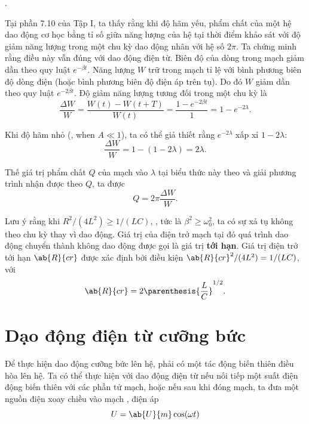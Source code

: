 .

Tại phần 7.10 của Tập I, ta thấy rằng khi độ hãm yếu, phẩm chất của một hệ dao động cơ học bằng tỉ số giữa năng lượng của hệ tại thời điểm khảo sát với độ giảm năng lượng trong một chu kỳ dao động nhân với hệ số $2\pi$.
Ta chứng minh rằng điều này vẫn đúng với dao động điện từ.
Biên độ của dòng trong mạch giảm dần theo quy luật $e^{-\beta t}$.
Năng lượng $W$ trữ trong mạch tỉ lệ với bình phương biên độ dòng điện (hoặc bình phương biên độ điện áp trên tụ).
Do đó $W$ giảm dần theo quy luật $e^{-2\beta t}$.
Độ giảm năng lượng tương đối trong một chu kỳ là
\begin{equation*}
    \frac{\Delta{W}}{W} = \frac{W(t) - W(t+T)}{W(t)} = \frac{1 - e^{-2\beta t}}{1} = 1 - e^{-2\lambda}.
\end{equation*}

\noindent
Khi độ hãm nhỏ (\ie, when $A\ll 1$), ta có thể giả thiết rằng $e^{-2\lambda}$ xấp xỉ $1-2\lambda$:
\begin{equation*}
    \frac{\Delta{W}}{W} = 1 - (1 - 2\lambda) = 2 \lambda.
\end{equation*}

\noindent
Thế giá trị phẩm chất $Q$ của mạch vào $\lambda$ tại biểu thức này theo  và giải phương trình nhận được theo $Q$, ta được
\begin{equation}\label{eq:13_23}
    Q = 2\pi \frac{\Delta{W}}{W}.
\end{equation}

Lưu ý rằng khi $R^2/(4L^2)\geqslant 1/(LC)$, \ie, tức là $\beta^2\geqslant\omega_0^2$, ta có sự xả tụ không theo chu kỳ thay vì dao động.
Giá trị của điện trở mạch tại đó quá trình dao động chuyển thành không dao động được gọi là giá trị \textbf{tới hạn}.
Giá trị điện trở tới hạn $\ab{R}{cr}$ được xác định bởi điều kiện $\ab{R}{cr}^2/(4L^2)= 1/(LC)$, với
\begin{equation}\label{eq:13_24}
    \ab{R}{cr} = 2 \parenthesis{\frac{L}{C}}^{1/2}.
\end{equation}

\section{Dạo động điện từ cưỡng bức}\label{sec:13_4}

Để thực hiện dao động cưỡng bức lên hệ, phải có một tác động biến thiên điều hòa lên hệ.
Ta có thể thực hiện với dao động điện từ nếu nối tiếp một suất điện động biến thiên với các phần tử mạch, hoặc nếu sau khi đóng mạch, ta đưa một nguồn điện xoay chiều vào mạch \ie, điện áp
\begin{equation}\label{eq:13_25}
    U = \ab{U}{m} \cos(\omega t)
\end{equation}

